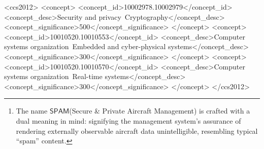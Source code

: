 \documentclass[9pt,sigconf,screen]{acmart}
\newcommand\sys{$\mathsf{SPAM}$\xspace}
\begin{document}
\begin{abstract}
With the rising use of aircrafts for operations ranging from disaster-relief to warfare, there is a growing risk of adversarial attacks. Malicious entities often only require the location of the aircraft for these attacks. Current satellite-aircraft communication and tracking protocols put aircrafts at risk if the satellite is compromised, due to computation being done in plaintext. In this work, we present \sys \footnote{The name \sys (Secure \& Private Aircraft Management) is crafted with a dual meaning in mind: signifying the management system's assurance of rendering externally observable aircraft data unintelligible, resembling typical ``spam'' content.}, a private, secure, and accurate system that allows satellites to efficiently manage and maintain tracking angles for aircraft fleets without learning aircrafts' locations. \sys is built upon multi-party computation and zero-knowledge proofs to guarantee privacy and high efficiency. While catered towards aircrafts, \sys's zero-knowledge fleet management can be easily extended to the IoT, with very little overhead.
\end{abstract}

\begin{CCSXML}
<ccs2012>
   <concept>
       <concept_id>10002978.10002979</concept_id>
       <concept_desc>Security and privacy~Cryptography</concept_desc>
       <concept_significance>500</concept_significance>
       </concept>
   <concept>
       <concept_id>10010520.10010553</concept_id>
       <concept_desc>Computer systems organization~Embedded and cyber-physical systems</concept_desc>
       <concept_significance>300</concept_significance>
       </concept>
   <concept>
       <concept_id>10010520.10010570</concept_id>
       <concept_desc>Computer systems organization~Real-time systems</concept_desc>
       <concept_significance>300</concept_significance>
       </concept>
 </ccs2012>
\end{CCSXML}


\end{document}
